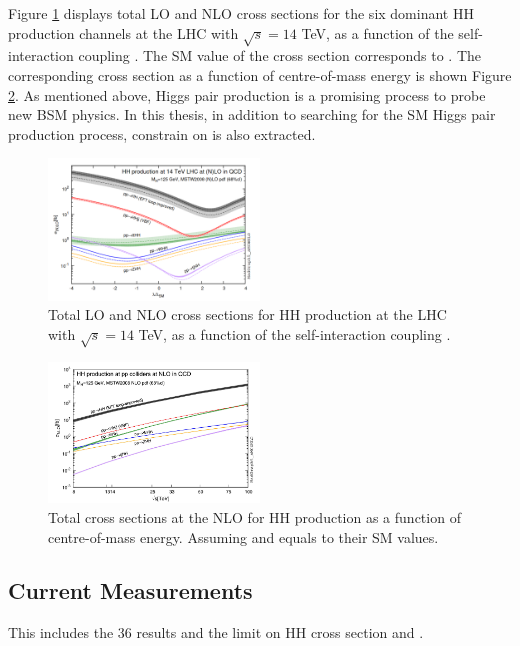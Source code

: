 Figure \ref{fig:chap1:HH:BSM:XSEC:L} displays total LO and NLO cross sections for the six dominant HH production channels at the LHC with $\sqrt{s}=14$ TeV, as a function of the self-interaction coupling \kl. The SM value of the cross section corresponds to . The corresponding cross section as a function of centre-of-mass energy is shown Figure \ref{fig:chap1:HH:BSM:XSEC:S}. As mentioned above, Higgs pair production is a promising process to probe new BSM physics. In this thesis, in addition to searching for the SM Higgs pair production process, constrain on \kl is also extracted.
\begin{figure}[H]
    \centering
    \includegraphics[width=0.5\textwidth]{Ch1/Img/HH_Xsec_as_lambda.png}
    \caption{Total LO and NLO cross sections for HH production at the LHC with $\sqrt{s}=14$ TeV, as a function of the self-interaction coupling \kl.}
    \label{fig:chap1:HH:BSM:XSEC:L}
\end{figure}
\begin{figure}[H]
    \centering
    \includegraphics[width=0.5\textwidth]{Ch1/Img/HH_XSec_as_S.png}
    \caption{Total cross sections at the NLO for HH production as a function of centre-of-mass energy. Assuming \kl and \kt equals to their SM values.}
    \label{fig:chap1:HH:BSM:XSEC:S}
\end{figure}
\subsection{Current Measurements}
\label{chap1:HH:CM}
This includes the 36 \ifb results and the limit on HH cross section and \kl.

